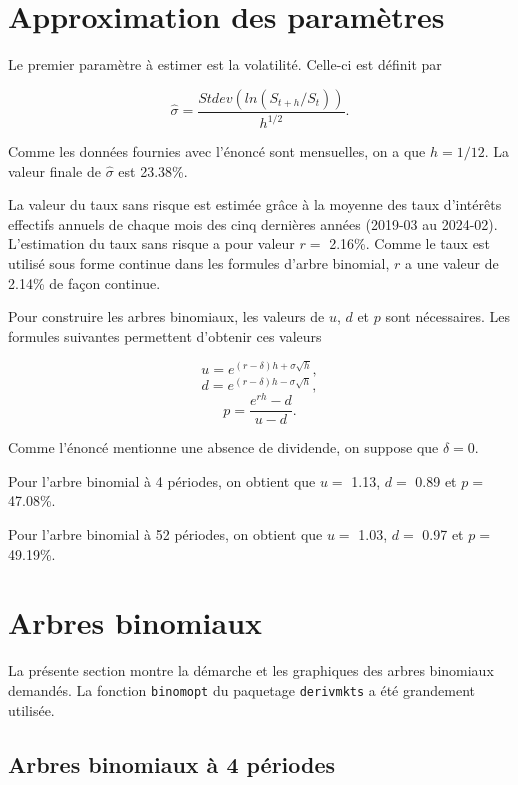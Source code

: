 \documentclass[
]{article}
\begin{document}
\centering

\clearpage

\tableofcontents

\justify  
\clearpage

\section{Approximation des
paramètres}\label{approximation-des-paramuxe8tres}

Le premier paramètre à estimer est la volatilité. Celle-ci est définit
par

\[
\hat{\sigma} = \frac{Stdev(ln(S_{t+h}/S_t))}{{h^{1/2}}}.
\]

Comme les données fournies avec l'énoncé sont mensuelles, on a que
\(h = 1/12\). La valeur finale de \(\hat{\sigma}\) est 23.38\%.

La valeur du taux sans risque est estimée grâce à la moyenne des taux
d'intérêts effectifs annuels de chaque mois des cinq dernières années
(2019-03 au 2024-02). L'estimation du taux sans risque a pour valeur
\(r =\) 2.16\%. Comme le taux est utilisé sous forme continue dans les
formules d'arbre binomial, \(r\) a une valeur de 2.14\% de façon
continue.

Pour construire les arbres binomiaux, les valeurs de \(u\), \(d\) et
\(p\) sont nécessaires. Les formules suivantes permettent d'obtenir ces
valeurs

\[
u = e^{(r-\delta)h+\sigma\sqrt{h}},
\] \[
d = e^{(r-\delta)h-\sigma\sqrt{h}},
\] \[
p=\frac{e^{rh}-d}{u-d}.
\]

Comme l'énoncé mentionne une absence de dividende, on suppose que
\(\delta = 0\).

Pour l'arbre binomial à 4 périodes, on obtient que \(u =\) 1.13, \(d =\)
0.89 et \(p =\) 47.08\%.

Pour l'arbre binomial à 52 périodes, on obtient que \(u =\) 1.03,
\(d =\) 0.97 et \(p =\) 49.19\%.

\section{Arbres binomiaux}\label{arbres-binomiaux}

La présente section montre la démarche et les graphiques des arbres
binomiaux demandés. La fonction \texttt{binomopt} du paquetage
\texttt{derivmkts} a été grandement utilisée.

\subsection{Arbres binomiaux à 4
périodes}\label{arbres-binomiaux-uxe0-4-puxe9riodes}
\end{document}
